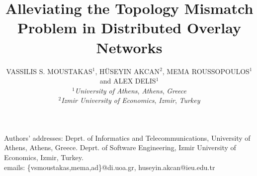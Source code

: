 \documentclass[acmcsur,acmnow]{acmtrans2m}
\title{Alleviating the Topology Mismatch Problem in Distributed Overlay Networks}
\author{
VASSILIS S. MOUSTAKAS$^1$, H\"USEYIN AKCAN$^2$, MEMA ROUSSOPOULOS$^1$ and ALEX
DELIS$^1$\\
$^1$\emph{University of Athens}, \emph{Athens}, \emph{Greece}\\
$^2$\emph{Izmir University of Economics}, \emph{Izmir}, \emph{Turkey}
}
\begin{document}
\begin{bottomstuff}
Authors' addresses: Deprt. of Informatics and Telecommunications,
University of Athens, Athens, Greece. Deprt. of Software
Engineering, Izmir University of Economics, Izmir, Turkey.\\
emails: \{vsmoustakas,mema,ad\}@di.uoa.gr, huseyin.akcan@ieu.edu.tr
\end{bottomstuff}

\maketitle




%
%
%
%
%





%
%
\end{document}
